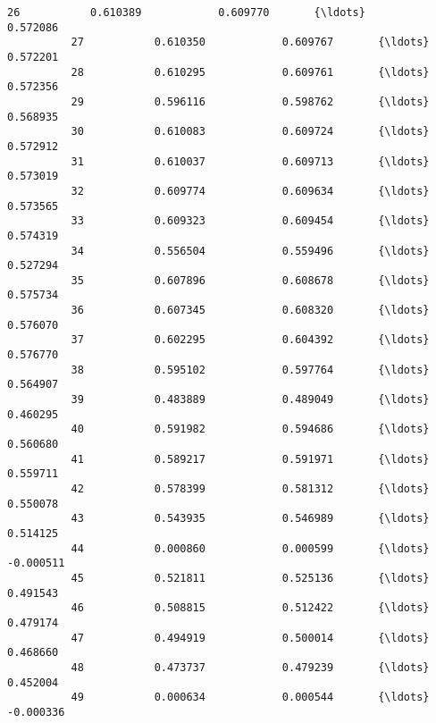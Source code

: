 \documentclass[11pt]{article}
\begin{document}
\begin{Verbatim}[commandchars=\\\{\}]
          26           0.610389            0.609770       {\ldots}                  0.572086   
          27           0.610350            0.609767       {\ldots}                  0.572201   
          28           0.610295            0.609761       {\ldots}                  0.572356   
          29           0.596116            0.598762       {\ldots}                  0.568935   
          30           0.610083            0.609724       {\ldots}                  0.572912   
          31           0.610037            0.609713       {\ldots}                  0.573019   
          32           0.609774            0.609634       {\ldots}                  0.573565   
          33           0.609323            0.609454       {\ldots}                  0.574319   
          34           0.556504            0.559496       {\ldots}                  0.527294   
          35           0.607896            0.608678       {\ldots}                  0.575734   
          36           0.607345            0.608320       {\ldots}                  0.576070   
          37           0.602295            0.604392       {\ldots}                  0.576770   
          38           0.595102            0.597764       {\ldots}                  0.564907   
          39           0.483889            0.489049       {\ldots}                  0.460295   
          40           0.591982            0.594686       {\ldots}                  0.560680   
          41           0.589217            0.591971       {\ldots}                  0.559711   
          42           0.578399            0.581312       {\ldots}                  0.550078   
          43           0.543935            0.546989       {\ldots}                  0.514125   
          44           0.000860            0.000599       {\ldots}                 -0.000511   
          45           0.521811            0.525136       {\ldots}                  0.491543   
          46           0.508815            0.512422       {\ldots}                  0.479174   
          47           0.494919            0.500014       {\ldots}                  0.468660   
          48           0.473737            0.479239       {\ldots}                  0.452004   
          49           0.000634            0.000544       {\ldots}                 -0.000336   
          

\end{Verbatim}
\end{document}
